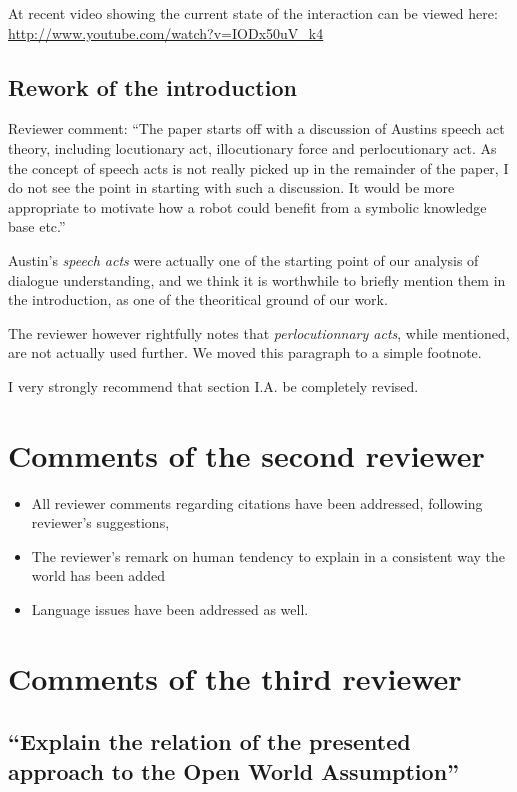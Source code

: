 \documentclass{article}
\begin{document}
At recent video showing the current state of the interaction can be viewed
here: \url{http://www.youtube.com/watch?v=IODx50uV_k4}

\subsection{Rework of the introduction} 

Reviewer comment: ``The paper starts off with a discussion
of Austins speech act theory, including locutionary act, illocutionary force
and perlocutionary act. As the concept of speech acts is not really picked up
in the remainder of the paper, I do not see the point in starting with such a
discussion. It would be more appropriate to motivate how a robot could benefit
from a symbolic knowledge base etc.''

Austin's \emph{speech acts} were actually one of the starting point of our
analysis of dialogue understanding, and we think it is worthwhile to briefly mention
them in the introduction, as one of the theoritical ground of our work.

The reviewer however rightfully notes that \emph{perlocutionnary acts}, while mentioned, are not
actually used further. We moved this paragraph to a simple footnote.

I very strongly recommend that section I.A. be completely revised.


\section{Comments of the second reviewer}

\begin{itemize}
\item All reviewer comments regarding citations have been addressed, following reviewer's suggestions,
\item The reviewer's remark on human tendency to explain in a consistent way the world has been added
\item Language issues have been addressed as well.
\end{itemize}

\section{Comments of the third reviewer}

\subsection{``Explain the relation of the presented approach to the Open World
Assumption''}
\end{document}
